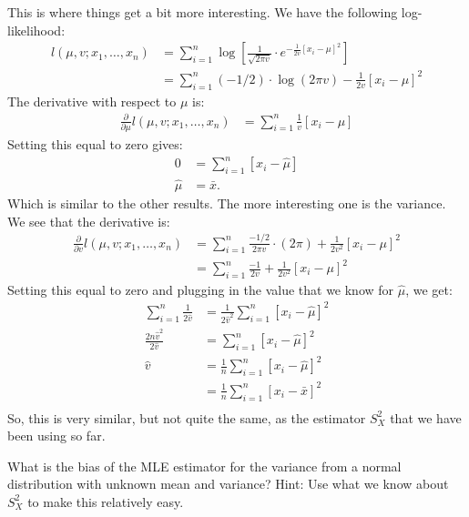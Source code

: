 
This is where things get a bit more interesting. We have the following
log-likelihood:
\begin{align*}
l(\mu, v; x_1, \ldots, x_n) &= \sum_{i=1}^n \log\left[ \frac{1}{\sqrt{2\pi v}} \cdot e^{-\frac{1}{2v} [x_i - \mu]^2} \right]  \\
&= \sum_{i=1}^n (-1/2) \cdot \log(2\pi v) - \frac{1}{2v} [x_i - \mu]^2
\end{align*}
The derivative with respect to $\mu$ is:
\begin{align*}
\frac{\partial}{\partial \mu} l(\mu, v; x_1, \ldots, x_n)
&= \sum_{i=1}^n \frac{1}{v} [x_i - \mu]
\end{align*}
Setting this equal to zero gives:
\begin{align*}
0 &= \sum_{i=1}^n [x_i - \hat{\mu}] \\
\hat{\mu} &= \bar{x}.
\end{align*}
Which is similar to the other results. The more interesting one is the variance.
We see that the derivative is:
\begin{align*}
\frac{\partial}{\partial v} l(\mu, v; x_1, \ldots, x_n)
&= \sum_{i=1}^n \frac{-1/2}{2 \pi v} \cdot (2 \pi) + \frac{1}{2v^2} [x_i - \mu]^2 \\
&= \sum_{i=1}^n \frac{-1}{2v} + \frac{1}{2v^2} [x_i - \mu]^2
\end{align*}
Setting this equal to zero and plugging in the value that we know for $\hat{\mu}$,
we get:
\begin{align*}
\sum_{i=1}^n \frac{1}{2\hat{v}} &= \frac{1}{2\hat{v}^2} \sum_{i=1}^n [x_i - \hat{\mu}]^2 \\
\frac{2 n \hat{v}^2}{2\hat{v}} &= \sum_{i=1}^n [x_i - \hat{\mu}]^2 \\
\hat{v}&= \frac{1}{n} \sum_{i=1}^n [x_i - \hat{\mu}]^2  \\
&= \frac{1}{n} \sum_{i=1}^n [x_i - \bar{x}]^2  \\
\end{align*}
So, this is very similar, but not quite the same, as the estimator $S_X^2$ that
we have been using so far.


What is the bias of the MLE estimator for the variance from a normal distribution
with unknown mean and variance? Hint: Use what we know about $S_X^2$ to make this
relatively easy.



